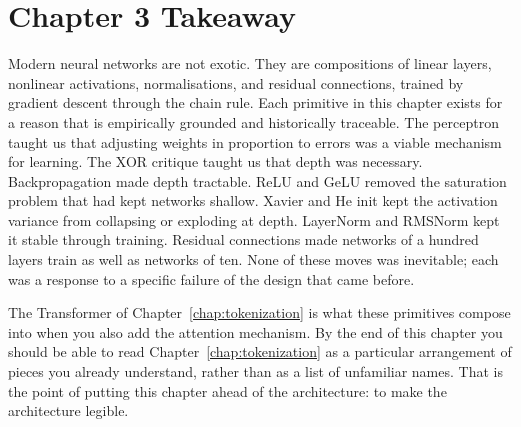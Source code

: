 \section{Chapter 3 Takeaway}

Modern neural networks are not exotic. They are compositions of
linear layers, nonlinear activations, normalisations, and
residual connections, trained by gradient descent through the
chain rule. Each primitive in this chapter exists for a reason
that is empirically grounded and historically traceable. The
perceptron taught us that adjusting weights in proportion to
errors was a viable mechanism for learning. The XOR critique
taught us that depth was necessary. Backpropagation made depth
tractable. ReLU and GeLU removed the saturation problem that had
kept networks shallow. Xavier and He init kept the activation
variance from collapsing or exploding at depth. LayerNorm and
RMSNorm kept it stable through training. Residual connections
made networks of a hundred layers train as well as networks of
ten. None of these moves was inevitable; each was a response to
a specific failure of the design that came before.

The Transformer of Chapter~\ref{chap:tokenization} is what these primitives compose
into when you also add the attention mechanism. By the end of
this chapter you should be able to read Chapter~\ref{chap:tokenization} as a
particular arrangement of pieces you already understand, rather
than as a list of unfamiliar names. That is the point of putting
this chapter ahead of the architecture: to make the architecture
legible.


